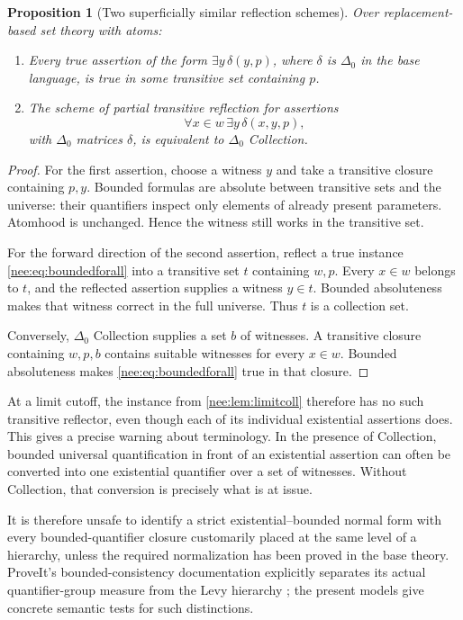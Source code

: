 \documentclass[11pt,letterpaper]{article}
\numberwithin{equation}{section}
\theoremstyle{plain}
\newtheorem{proposition}[proposition]{Proposition}
\theoremstyle{definition}
\theoremstyle{remark}
\begin{document}
\begin{proposition}[Two superficially similar reflection schemes]\label{nee:prop:partial}
Over replacement-based set theory with atoms:
\begin{enumerate}
\item Every true assertion of the form $\exists y\,\delta(y,p)$, where $\delta$ is $\Delta_0$ in the base language, is true in some transitive set containing $p$.
\item The scheme of partial transitive reflection for assertions
\begin{equation}\label{nee:eq:boundedforall}
\forall x\in w\,\exists y\,\delta(x,y,p),
\end{equation}
with $\Delta_0$ matrices $\delta$, is equivalent to $\Delta_0$ Collection.
\end{enumerate}
\end{proposition}
\begin{proof}
For the first assertion, choose a witness $y$ and take a transitive closure containing $p,y$. Bounded formulas are absolute between transitive sets and the universe: their quantifiers inspect only elements of already present parameters. Atomhood is unchanged. Hence the witness still works in the transitive set.

For the forward direction of the second assertion, reflect a true instance \eqref{nee:eq:boundedforall} into a transitive set $t$ containing $w,p$. Every $x\in w$ belongs to $t$, and the reflected assertion supplies a witness $y\in t$. Bounded absoluteness makes that witness correct in the full universe. Thus $t$ is a collection set.

Conversely, $\Delta_0$ Collection supplies a set $b$ of witnesses. A transitive closure containing $w,p,b$ contains suitable witnesses for every $x\in w$. Bounded absoluteness makes \eqref{nee:eq:boundedforall} true in that closure.
\end{proof}

At a limit cutoff, the instance from \cref{nee:lem:limitcoll} therefore has no such transitive reflector, even though each of its individual existential assertions does. This gives a precise warning about terminology. In the presence of Collection, bounded universal quantification in front of an existential assertion can often be converted into one existential quantifier over a set of witnesses. Without Collection, that conversion is precisely what is at issue.

It is therefore unsafe to identify a strict existential--bounded normal form with every bounded-quantifier closure customarily placed at the same level of a hierarchy, unless the required normalization has been proved in the base theory. ProveIt's bounded-consistency documentation explicitly separates its actual quantifier-group measure from the Levy hierarchy \cite{RepoBC}; the present models give concrete semantic tests for such distinctions.
\end{document}
